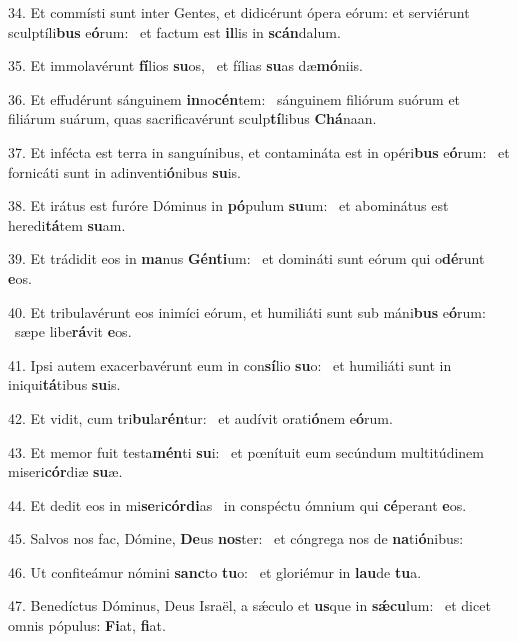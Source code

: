 34. Et commísti sunt inter Gentes, et didicérunt ópera eórum: et serviérunt sculptíli\textbf{bus} e\textbf{ó}rum: \ast\  et factum est \textbf{il}lis in \textbf{scán}dalum.\

35. Et immolavérunt \textbf{fí}lios \textbf{su}os, \ast\  et fílias \textbf{su}as dæ\textbf{mó}niis.\

36. Et effudérunt sánguinem \textbf{in}no\textbf{cén}tem: \ast\  sánguinem filiórum suórum et filiárum suárum, quas sacrificavérunt sculp\textbf{tí}libus \textbf{Chá}naan.\

37. Et infécta est terra in sanguínibus, et contamináta est in opéri\textbf{bus} e\textbf{ó}rum: \ast\  et fornicáti sunt in adinventi\textbf{ó}nibus \textbf{su}is.\

38. Et irátus est furóre Dóminus in \textbf{pó}pulum \textbf{su}um: \ast\  et abominátus est heredi\textbf{tá}tem \textbf{su}am.\

39. Et trádidit eos in \textbf{ma}nus \textbf{Gén}\textbf{ti}um: \ast\  et domináti sunt eórum qui o\textbf{dé}runt \textbf{e}os.\

40. Et tribulavérunt eos inimíci eórum, et humiliáti sunt sub máni\textbf{bus} e\textbf{ó}rum: \ast\  sæpe libe\textbf{rá}vit \textbf{e}os.\

41. Ipsi autem exacerbavérunt eum in con\textbf{sí}lio \textbf{su}o: \ast\  et humiliáti sunt in iniqui\textbf{tá}tibus \textbf{su}is.\

42. Et vidit, cum tri\textbf{bu}la\textbf{rén}tur: \ast\  et audívit orati\textbf{ó}nem e\textbf{ó}rum.\

43. Et memor fuit testa\textbf{mén}ti \textbf{su}i: \ast\  et pœnítuit eum secúndum multitúdinem miseri\textbf{cór}diæ \textbf{su}æ.\

44. Et dedit eos in mi\textbf{se}ri\textbf{cór}\textbf{di}as \ast\  in conspéctu ómnium qui \textbf{cé}perant \textbf{e}os.\

45. Salvos nos fac, Dómine, \textbf{De}us \textbf{nos}ter: \ast\  et cóngrega nos de \textbf{na}ti\textbf{ó}nibus:\

46. Ut confiteámur nómini \textbf{sanc}to \textbf{tu}o: \ast\  et gloriémur in \textbf{lau}de \textbf{tu}a.\

47. Benedíctus Dóminus, Deus Israël, a sǽculo et \textbf{us}que in \textbf{sǽ}\textbf{cu}lum: \ast\  et dicet omnis pópulus: \textbf{Fi}at, \textbf{fi}at.\

